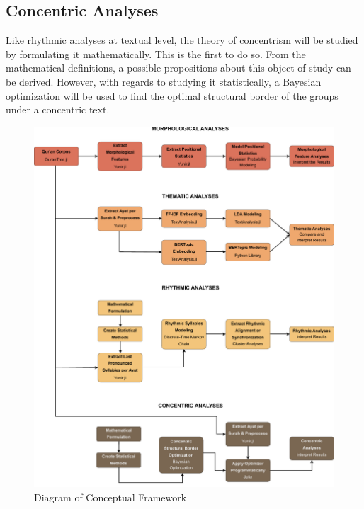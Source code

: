 \subsection{Concentric Analyses}
Like rhythmic analyses at textual level, the theory of concentrism will be studied by formulating it mathematically. This is the first to do so. From the mathematical definitions, a possible propositions about this object of study can be derived. However, with regards to studying it statistically, a Bayesian optimization will be used to find the optimal structural border of the groups under a concentric text.
\begin{figure}
    \label{fig:conceptual-framework}
    \includegraphics[width=\textwidth]{img/conceptual_framework.pdf}
    \caption{Diagram of Conceptual Framework}
\end{figure}